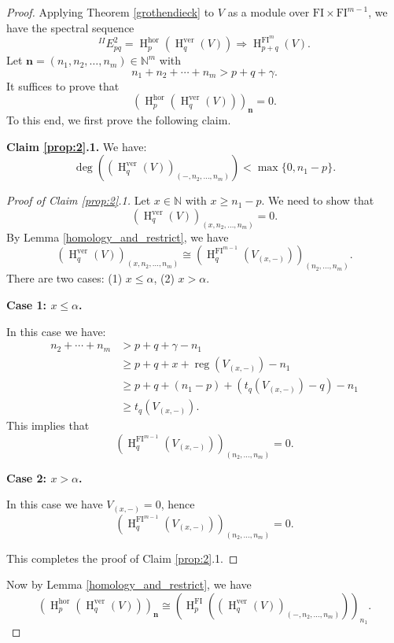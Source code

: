 \documentclass[10pt,a4paper]{amsart}
\DeclareMathOperator{\HH}{H}
\DeclareMathOperator{\reg}{reg}
\newcommand{\FI}{{\mathrm{FI}}}
\newcommand{\N}{{\mathbb{N}}}
\newcommand{\hor}{{\mathrm{hor}}}
\newcommand{\ver}{{\mathrm{ver}}}
\begin{document}
\begin{proof}
   Applying Theorem \ref{grothendieck} to $V$ as a module over $\FI\times \FI^{m-1}$, we have the spectral sequence
   \[  ^{II}\!E^2_{pq} = \HH^\hor_p (\HH^\ver_q (V)) \Rightarrow \HH^{\FI^m}_{p+q}(V).  \]
   Let $\mathbf{n}=(n_1, n_2, \ldots, n_m) \in \N^m$ with 
   \[ n_1 + n_2 + \cdots + n_m > p+q+\gamma. \]
   It suffices to prove that 
   \[ (\HH^\hor_p (\HH^\ver_q (V)))_{\mathbf{n}} = 0. \]
   To this end, we first prove the following claim.
   
   \medskip 
   
   {\bf Claim \ref{prop:2}.1.} We have:
   \[ \deg\left( (\HH^\ver_q(V))_{(-, n_2, \ldots, n_m)} \right) < \max\{0, n_1-p\}. \]
   
   \begin{proof}[Proof of Claim \ref{prop:2}.1]
      Let $x\in \N$ with $x\geqslant n_1-p$. We need to show that 
      \[ (\HH^\ver_q(V))_{(x, n_2, \ldots, n_m)} = 0. \] 
      By Lemma \ref{homology_and_restrict}, we have
      \[ (\HH^\ver_q(V))_{(x, n_2, \ldots, n_m)} \cong (\HH^{\FI^{m-1}}_q(V_{(x, -)}))_{(n_2, \ldots, n_m)}. \]
      There are two cases: (1) $x\leqslant \alpha$, (2) $x>\alpha$.

      \medskip 


      {\bf Case 1: $x\leqslant \alpha$.}

      In this case we have:
      \begin{align*}
         n_2 + \cdots + n_m &> p+q+\gamma-n_1  \\
         &\geqslant p+q+x+  \reg\left(V_{(x, -)}\right) -n_1  \\
         &\geqslant p+q+(n_1-p) + \left(t_q\left(V_{(x,-)}\right) - q\right)-n_1 \\
         &\geqslant t_q\left(V_{(x,-)}\right).
      \end{align*}
      This implies that 
      \[ (\HH^{\FI^{m-1}}_q(V_{(x, -)}))_{(n_2, \ldots, n_m)} = 0. \]

      \medskip 



      {\bf Case 2: $x>\alpha$.} 

      In this case we have $V_{(x, -)}=0$, hence 
      \[ (\HH^{\FI^{m-1}}_q(V_{(x, -)}))_{(n_2, \ldots, n_m)} = 0. \]

      \medskip 

      This completes the proof of Claim \ref{prop:2}.1.
   \end{proof}

     Now by Lemma \ref{homology_and_restrict}, we have
      \[  (\HH^\hor_p (\HH^\ver_q (V)))_{\mathbf{n}} \cong (\HH^{\FI}_p( (\HH^\ver_q (V) )_{(-, n_2, \ldots, n_m)}  ))_{n_1}. \]
   

\end{proof}
\end{document}
